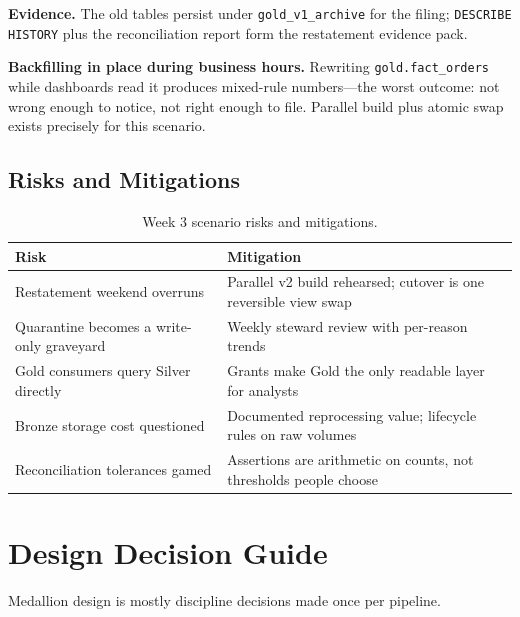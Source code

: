 \textbf{Evidence.} The old tables persist under \texttt{gold\_v1\_archive} for the filing; \texttt{DESCRIBE HISTORY} plus the reconciliation report form the restatement evidence pack.

\begin{pitfall}
\textbf{Backfilling in place during business hours.} Rewriting \texttt{gold.fact\_orders} while dashboards read it produces mixed-rule numbers---the worst outcome: not wrong enough to notice, not right enough to file. Parallel build plus atomic swap exists precisely for this scenario.
\end{pitfall}

\subsection{Risks and Mitigations}
\begin{table}[H]
\centering
\small
\begin{tabular}{@{}p{4.6cm}p{7.6cm}@{}}
\toprule
\textbf{Risk} & \textbf{Mitigation} \\
\midrule
Restatement weekend overruns & Parallel v2 build rehearsed; cutover is one reversible view swap \\
Quarantine becomes a write-only graveyard & Weekly steward review with per-reason trends \\
Gold consumers query Silver directly & Grants make Gold the only readable layer for analysts \\
Bronze storage cost questioned & Documented reprocessing value; lifecycle rules on raw volumes \\
Reconciliation tolerances gamed & Assertions are arithmetic on counts, not thresholds people choose \\
\bottomrule
\end{tabular}
\caption{Week 3 scenario risks and mitigations.}
\label{tab:ch3-risks}
\end{table}

\section{Design Decision Guide}
%
Medallion design is mostly discipline decisions made once per pipeline.

